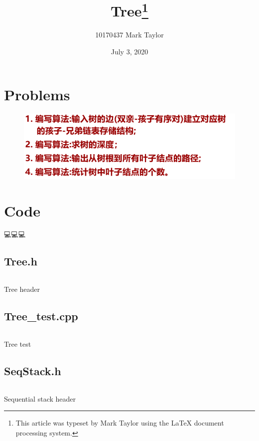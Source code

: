 \documentclass{article}
\begin{document}
	
	
	\title{Tree\footnote{
			This article was typeset by Mark Taylor using 
	the \protect\LaTeX{}
			document processing system. }}
	
	\author{10170437 Mark Taylor}
	
	\date{July 3, 2020}
	
	\maketitle
		
	\hypertarget{Contents}{}  %
	\tableofcontents
	
	
	\section{Problems}
	\begin{figure}[!hb]
		\centering
		\includegraphics[width=0.7\linewidth]{img/problems}
		\caption*{}
		\label{fig:problem}
	\end{figure}
	
	\section{Code}
	💻💻💻
	\subsection{Tree.h}		
	\begin{longlisting}
		\inputminted{c++}{src/Tree.h}
		\caption{Tree header}
		\label{Tree.h}
	\end{longlisting}
	
	\subsection{Tree\_test.cpp}	
	\begin{longlisting}
		\inputminted{c++}{src/Tree_test.cpp}
		\caption{Tree test}
		\label{Tree_test.cpp}
	\end{longlisting}

	\subsection{SeqStack.h}	
	\begin{longlisting}
		\inputminted{c++}{src/SeqStack.h}
		\caption{Sequential stack header}
		\label{SeqStack.h}
	\end{longlisting}
\end{document}
